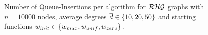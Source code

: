 \begin{figure}[!htb]
  \centering
  \caption{
      Number of Queue-Insertions per algorithm for $\mathcal{RHG}$ graphs with $n = 10000$ nodes, average degrees $\overline{d} \in \left\{10, 20, 50\right\}$ and starting functions $w_{init} \in \left\{w_{max}, w_{unif}, w_{zero}\right\}$.
  }
  \label{fig:app_ins_rhg}
\end{figure}

